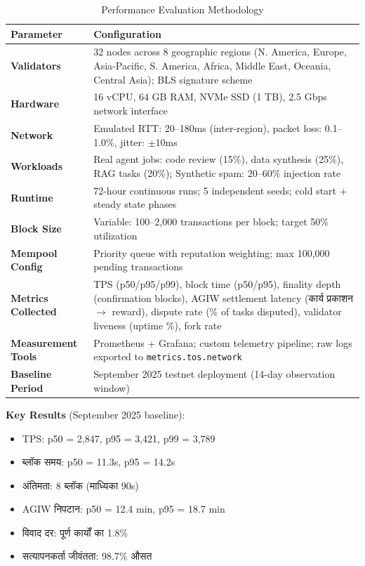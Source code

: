 \documentclass[11pt]{article}
\begin{document}
\begin{itemize}[noitemsep]
\begin{itemize}[noitemsep]
\begin{table}[H]
\centering
\caption{Performance Evaluation Methodology}
\label{tab:evaluation-methodology}
\begin{tabular}{@{}p{}p{}@{}}
\toprule
\textbf{Parameter} & \textbf{Configuration} \\ \midrule
\textbf{Validators} & 32 nodes across 8 geographic regions (N. America, Europe, Asia-Pacific, S. America, Africa, Middle East, Oceania, Central Asia); BLS signature scheme \\
\textbf{Hardware} & 16 vCPU, 64 GB RAM, NVMe SSD (1 TB), 2.5 Gbps network interface \\
\textbf{Network} & Emulated RTT: 20--180ms (inter-region), packet loss: 0.1--1.0\%, jitter: $\pm$10ms \\
\textbf{Workloads} & Real agent jobs: code review (15\%), data synthesis (25\%), RAG tasks (20\%); Synthetic spam: 20--60\% injection rate \\
\textbf{Runtime} & 72-hour continuous runs; 5 independent seeds; cold start + steady state phases \\
\textbf{Block Size} & Variable: 100--2,000 transactions per block; target 50\% utilization \\
\textbf{Mempool Config} & Priority queue with reputation weighting; max 100,000 pending transactions \\
\textbf{Metrics Collected} & TPS (p50/p95/p99), block time (p50/p95), finality depth (confirmation blocks), AGIW settlement latency (कार्य प्रकाशन $\rightarrow$ reward), dispute rate (\% of tasks disputed), validator liveness (uptime \%), fork rate \\
\textbf{Measurement Tools} & Prometheus + Grafana; custom telemetry pipeline; raw logs exported to \texttt{metrics.tos.network} \\
\textbf{Baseline Period} & September 2025 testnet deployment (14-day observation window) \\
\bottomrule
\end{tabular}
\end{table}

\textbf{Key Results} (September 2025 baseline):
\begin{itemize}[noitemsep]
  \item TPS: p50 = 2,847, p95 = 3,421, p99 = 3,789
  \item ब्लॉक समय: p50 = 11.3s, p95 = 14.2s
  \item अंतिमता: 8 ब्लॉक (माध्यिका 90s)
  \item AGIW निपटान: p50 = 12.4 min, p95 = 18.7 min
  \item विवाद दर: पूर्ण कार्यों का 1.8\%
  \item सत्यापनकर्ता जीवंतता: 98.7\% औसत
\end{itemize}


\end{itemize}
\end{itemize}
\end{document}
